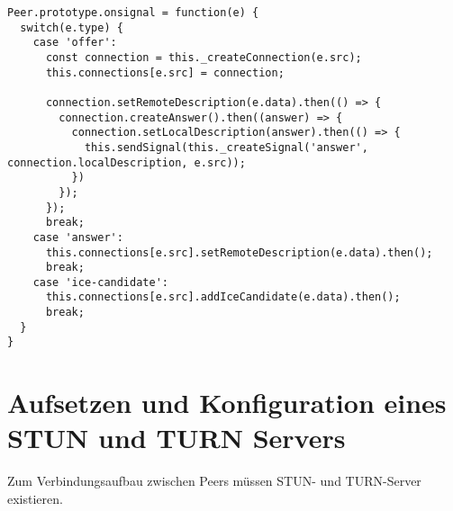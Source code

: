 \begin{lstlisting}[caption={Javascript LstListing Test}, captionpos=b, label={lst:candidate}]
Peer.prototype.onsignal = function(e) {
  switch(e.type) {
    case 'offer':
      const connection = this._createConnection(e.src);
      this.connections[e.src] = connection;

      connection.setRemoteDescription(e.data).then(() => {
        connection.createAnswer().then((answer) => {
          connection.setLocalDescription(answer).then(() => {
            this.sendSignal(this._createSignal('answer', connection.localDescription, e.src));
          })
        });
      });
      break;
    case 'answer':
      this.connections[e.src].setRemoteDescription(e.data).then();
      break;
    case 'ice-candidate':
      this.connections[e.src].addIceCandidate(e.data).then();
      break;
  }
}
\end{lstlisting}

\section{Aufsetzen und Konfiguration eines STUN und TURN Servers}
Zum Verbindungsaufbau zwischen Peers müssen \acs{STUN}- und \acs{TURN}-Server existieren.
